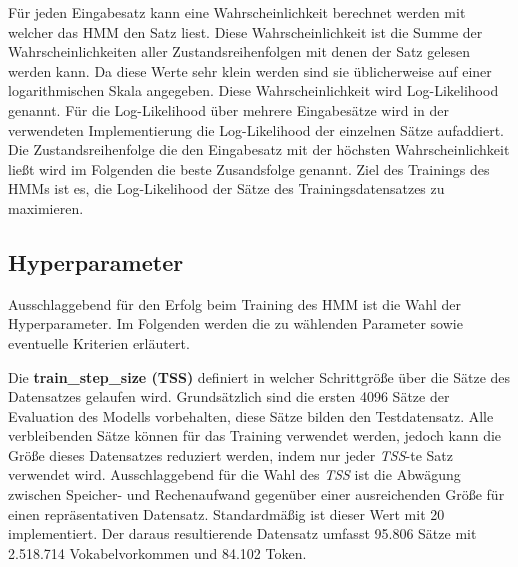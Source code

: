 \documentclass[conference]{IEEEtran}
\begin{document}
Für jeden Eingabesatz kann eine Wahrscheinlichkeit berechnet werden mit welcher das HMM den Satz liest. 
Diese Wahrscheinlichkeit ist die Summe der Wahrscheinlichkeiten aller Zustandsreihenfolgen mit denen der Satz gelesen werden kann.
Da diese Werte sehr klein werden sind sie üblicherweise auf einer logarithmischen Skala angegeben.
Diese Wahrscheinlichkeit wird Log-Likelihood genannt.
Für die Log-Likelihood über mehrere Eingabesätze wird in der verwendeten Implementierung die Log-Likelihood der einzelnen Sätze aufaddiert.
Die Zustandsreihenfolge die den Eingabesatz mit der höchsten Wahrscheinlichkeit ließt wird im Folgenden die beste Zusandsfolge genannt.
Ziel des Trainings des HMMs ist es, die Log-Likelihood der Sätze des Trainingsdatensatzes zu maximieren.

\subsection{Hyperparameter}
Ausschlaggebend für den Erfolg beim Training des HMM ist die Wahl der Hyperparameter.
Im Folgenden werden die zu wählenden Parameter sowie eventuelle Kriterien erläutert.

Die \textbf{train\_step\_size (TSS)} definiert in welcher Schrittgröße über die Sätze des Datensatzes gelaufen wird. 
Grundsätzlich sind die ersten 4096 Sätze der Evaluation des Modells vorbehalten, diese Sätze bilden den Testdatensatz. 
Alle verbleibenden Sätze können für das Training verwendet werden, jedoch kann die Größe dieses Datensatzes reduziert werden, indem nur jeder \textit{TSS}-te Satz verwendet wird. 
Ausschlaggebend für die Wahl des \textit{TSS} ist die Abwägung zwischen Speicher- und Rechenaufwand gegenüber einer ausreichenden Größe für einen repräsentativen Datensatz. 
Standardmäßig ist dieser Wert mit 20 implementiert.
Der daraus resultierende Datensatz umfasst 95.806 Sätze mit 2.518.714 Vokabelvorkommen und 84.102 Token.
\end{document}
